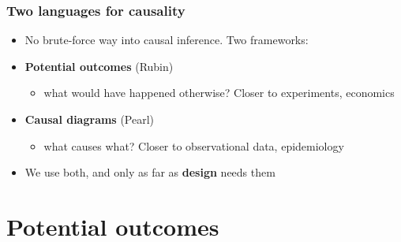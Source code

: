 \begin{frame}
\frametitle{Two languages for causality}
\centering

\begin{itemize}
  \item No brute-force way into causal inference. Two frameworks:
  \vspace{8pt}
  \item[1.] \textbf{Potential outcomes} (Rubin)
  \begin{itemize}
    \item what would have happened otherwise? Closer to experiments, economics
  \end{itemize}
  \vspace{8pt}
  \item[2.] \textbf{Causal diagrams} (Pearl)
  \begin{itemize}
    \item what causes what? Closer to observational data, epidemiology
  \end{itemize}
  \vspace{8pt}
  \item<2-> We use both, and only as far as \textbf{design} needs them
\end{itemize}

\end{frame}

\section{Potential outcomes}

